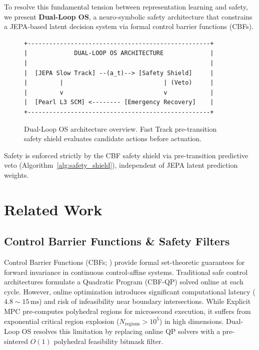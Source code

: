 \documentclass[10pt,twocolumn,letterpaper]{article}
\begin{document}
To resolve this fundamental tension between representation learning and safety, we present \textbf{Dual-Loop OS}, a neuro-symbolic safety architecture that constrains a JEPA-based latent decision system via formal control barrier functions (CBFs).

\begin{figure}[h]
\centering
\begin{verbatim}
+---------------------------------------------------+
|             DUAL-LOOP OS ARCHITECTURE             |
|                                                   |
|  [JEPA Slow Track] --(a_t)--> [Safety Shield]     |
|         |                            | (Veto)     |
|         v                            v            |
|  [Pearl L3 SCM] <-------- [Emergency Recovery]    |
+---------------------------------------------------+
\end{verbatim}
\caption{Dual-Loop OS architecture overview. Fast Track pre-transition safety shield evaluates candidate actions before actuation.}
\label{fig:arch_ascii}
\end{figure}

Safety is enforced strictly by the CBF safety shield via pre-transition predictive veto (Algorithm~\ref{alg:safety_shield}), independent of JEPA latent prediction weights.

\section{Related Work}

\subsection{Control Barrier Functions \& Safety Filters}
Control Barrier Functions (CBFs; \citealp{ames2019control,tayal2023exponential}) provide formal set-theoretic guarantees for forward invariance in continuous control-affine systems. Traditional safe control architectures formulate a Quadratic Program (CBF-QP) solved online at each cycle. However, online optimization introduces significant computational latency ($4.8 \sim 15\,\mathrm{ms}$) and risk of infeasibility near boundary intersections. While Explicit MPC \citep{bemporad2002explicit} pre-computes polyhedral regions for microsecond execution, it suffers from exponential critical region explosion ($N_{\mathrm{regions}} > 10^5$) in high dimensions. Dual-Loop OS resolves this limitation by replacing online QP solvers with a pre-sintered $O(1)$ polyhedral feasibility bitmask filter.
\end{document}
